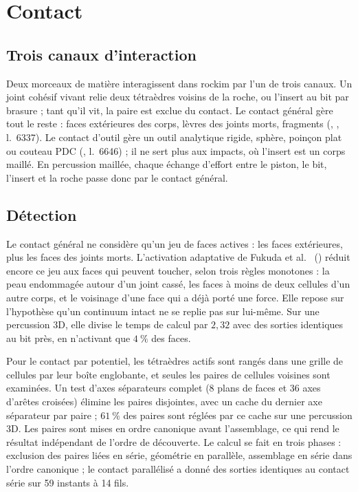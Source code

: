 \section{Contact}
\label{sec-contact}

\subsection{Trois canaux d'interaction}

Deux morceaux de matière interagissent dans rockim par l'un de trois canaux. Un joint cohésif vivant relie deux tétraèdres voisins de la roche, ou l'insert au bit par brasure ; tant qu'il vit, la paire est exclue du contact. Le contact général gère tout le reste : faces extérieures des corps, lèvres des joints morts, fragments (, , l.~6337). Le contact d'outil gère un outil analytique rigide, sphère, poinçon plat ou couteau PDC (, l.~6646) ; il ne sert plus aux impacts, où l'insert est un corps maillé. En percussion maillée, chaque échange d'effort entre le piston, le bit, l'insert et la roche passe donc par le contact général.

\subsection{Détection}

Le contact général ne considère qu'un jeu de faces actives : les faces extérieures, plus les faces des joints morts. L'activation adaptative de Fukuda et al.~\cite{fukuda2020rmre} () réduit encore ce jeu aux faces qui peuvent toucher, selon trois règles monotones : la peau endommagée autour d'un joint cassé, les faces à moins de deux cellules d'un autre corps, et le voisinage d'une face qui a déjà porté une force. Elle repose sur l'hypothèse qu'un continuum intact ne se replie pas sur lui-même. Sur une percussion 3D, elle divise le temps de calcul par $2{,}32$ avec des sorties identiques au bit près, en n'activant que $4~\%$ des faces.

Pour le contact par potentiel, les tétraèdres actifs sont rangés dans une grille de cellules par leur boîte englobante, et seules les paires de cellules voisines sont examinées. Un test d'axes séparateurs complet (8 plans de faces et 36 axes d'arêtes croisées) élimine les paires disjointes, avec un cache du dernier axe séparateur par paire ; $61~\%$ des paires sont réglées par ce cache sur une percussion 3D. Les paires sont mises en ordre canonique avant l'assemblage, ce qui rend le résultat indépendant de l'ordre de découverte. Le calcul se fait en trois phases : exclusion des paires liées en série, géométrie en parallèle, assemblage en série dans l'ordre canonique ; le contact parallélisé a donné des sorties identiques au contact série sur 59 instants à 14 fils.

